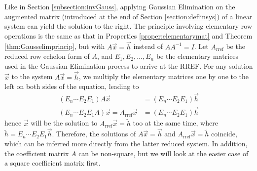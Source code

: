 Like in Section \ref{subsection:invGauss}, applying Gaussian Elimination on the augmented matrix (introduced at the end of Section \ref{section:deflinsys}) of a linear system can yield the solution to the right. The principle involving elementary row operations is the same as that in Properties \ref{proper:elementarymat} and Theorem \ref{thm:Gausselimprincip}, but with $A\vec{x} = \vec{h}$ instead of $AA^{-1} = I$. Let $A_{\text{rref}}$ be the reduced row echelon form of $A$, and $E_1, E_2, \ldots, E_n$ be the elementary matrices used in the Gaussian Elimination process to arrive at the RREF. For any solution $\vec{x}$ to the system $A\vec{x} = \vec{h}$, we multiply the elementary matrices one by one to the left on both sides of the equation, leading to
\begin{align}
(E_n\cdots E_2E_1)A\vec{x} &= (E_n\cdots E_2E_1)\vec{h} \nonumber \\
(E_n\cdots E_2E_1A)\vec{x} = A_{\text{rref}}\vec{x} &= (E_n\cdots E_2E_1)\vec{h} 
\end{align}
hence $\vec{x}$ will be the solution to $A_{\text{rref}}\vec{x} = \tilde{h}$ too at the same time, where $\tilde{h} = E_n\cdots E_2E_1\vec{h}$. Therefore, the solutions of $A\vec{x} = \vec{h}$ and $A_{\text{rref}}\vec{x} = \tilde{h}$ coincide, which can be inferred more directly from the latter reduced system. In addition, the coefficient matrix $A$ can be non-square, but we will look at the easier case of a square coefficient matrix first.

